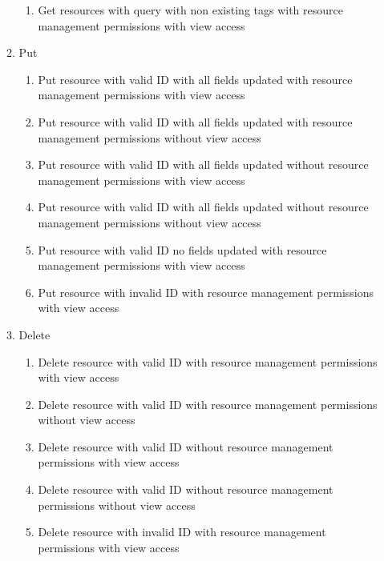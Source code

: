 \documentclass[12pt]{article}
\begin{document}
\begin{enumerate}
\begin{enumerate}
\begin{enumerate}
            \item Get resources with query with non existing tags with resource management permissions with view access    
        \end{enumerate}
        \item Put
        \begin{enumerate}
            \item Put resource with valid ID with all fields updated with resource management permissions with view access
            \item Put resource with valid ID with all fields updated with resource management permissions without view access
            \item Put resource with valid ID with all fields updated without resource management permissions with view access
            \item Put resource with valid ID with all fields updated without resource management permissions without view access
            \item Put resource with valid ID no fields updated with resource management permissions with view access
            \item Put resource with invalid ID with resource management permissions with view access
        \end{enumerate}
        \item Delete
        \begin{enumerate}
            \item Delete resource with valid ID with resource management permissions with view access
            \item Delete resource with valid ID with resource management permissions without view access
            \item Delete resource with valid ID without resource management permissions with view access
            \item Delete resource with valid ID without resource management permissions without view access
            \item Delete resource with invalid ID with resource management permissions with view access
        \end{enumerate}
        

\end{enumerate}
\end{enumerate}
\end{document}
